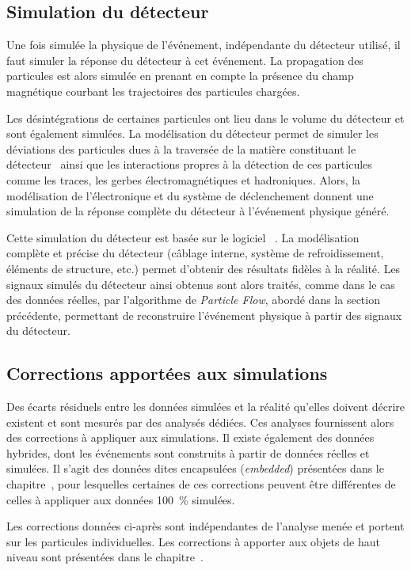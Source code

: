 \subsection{Simulation du détecteur}\label{chapter-LHC-section-MC-subsec-detector_sim}
Une fois simulée la physique de l'événement, indépendante du détecteur utilisé, il faut simuler la réponse du détecteur à cet événement.
La propagation des particules est alors simulée en prenant en compte la présence du champ magnétique courbant les trajectoires des particules chargées.
\par Les désintégrations de certaines particules ont lieu dans le volume du détecteur et sont également simulées.
La modélisation du détecteur permet de simuler les déviations des particules dues à la traversée de la matière constituant le détecteur~\cite{moliere_scat_1,moliere_scat_2} ainsi que les interactions propres à la détection de ces particules comme les traces, les gerbes électromagnétiques et hadroniques.
Alors, la modélisation de l'électronique et du système de déclenchement donnent une simulation de la réponse complète du détecteur à l'événement physique généré.
\par Cette simulation du détecteur est basée sur le logiciel
\GEANTfour~\cite{geant4_2003,geant4_2006,geant4_2016}.
La modélisation complète et précise du détecteur (câblage interne, système de refroidissement, éléments de structure, etc.) permet d'obtenir des résultats fidèles à la réalité.
Les signaux simulés du détecteur ainsi obtenus sont alors traités, comme dans le cas des données réelles, par l'algorithme de \emph{Particle Flow}, abordé dans la section précédente, permettant de reconstruire l'événement physique à partir des signaux du détecteur.
\subsection{Corrections apportées aux simulations}
Des écarts résiduels entre les données simulées et la réalité qu'elles doivent décrire existent et sont mesurés par des analysés dédiées.
Ces analyses fournissent alors des corrections à appliquer aux simulations.
Il existe également des données hybrides, dont les événements sont construits à partir de données réelles et simulées.
Il s'agit des données dites \og encapsulées \fg{} (\emph{embedded}) présentées dans le chapitre~, pour lesquelles certaines de ces corrections peuvent être différentes de celles à appliquer aux données \SI{100}{\%} simulées.
\par
Les corrections données ci-après sont indépendantes de l'analyse menée et portent sur les particules individuelles.
Les corrections à apporter aux objets de haut niveau sont présentées dans le chapitre~.
